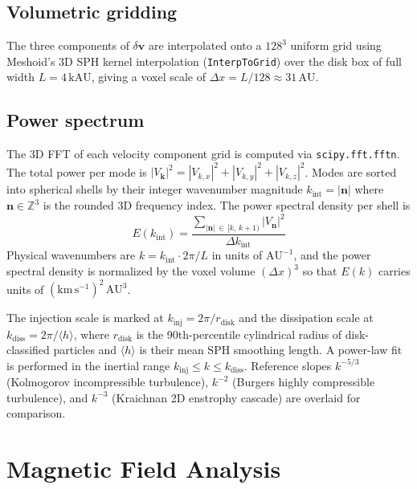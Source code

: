 \documentclass[12pt]{article}
\begin{document}
\subsection*{Volumetric gridding}

The three components of $\delta\mathbf{v}$ are interpolated onto a $128^3$
uniform grid using Meshoid's 3D SPH kernel interpolation (\texttt{InterpToGrid})
over the disk box of full width $L = 4\,\mathrm{kAU}$, giving a voxel scale of
$\Delta x = L/128 \approx 31\,\mathrm{AU}$.

\subsection*{Power spectrum}

The 3D FFT of each velocity component grid is computed via
\texttt{scipy.fft.fftn}. The total power per mode is
$|V_\mathbf{k}|^2 = |V_{k,x}|^2 + |V_{k,y}|^2 + |V_{k,z}|^2$. Modes are
sorted into spherical shells by their integer wavenumber magnitude
$k_\mathrm{int} = |\mathbf{n}|$ where
$\mathbf{n} \in \mathbb{Z}^3$ is the rounded 3D frequency index. The power
spectral density per shell is
\begin{equation}
    E(k_\mathrm{int}) = \frac{\sum_{|\mathbf{n}|\,\in\,[k,\,k+1)} |V_\mathbf{n}|^2}{\Delta k_\mathrm{int}}
\end{equation}
Physical wavenumbers are $k = k_\mathrm{int}\cdot 2\pi/L$ in units of
$\mathrm{AU}^{-1}$, and the power spectral density is normalized by the voxel
volume $(\Delta x)^3$ so that $E(k)$ carries units of
$(\mathrm{km\,s^{-1}})^2\,\mathrm{AU}^3$.

The injection scale is marked at $k_\mathrm{inj} = 2\pi/r_\mathrm{disk}$ and the
dissipation scale at $k_\mathrm{diss} = 2\pi/\langle h\rangle$, where
$r_\mathrm{disk}$ is the 90th-percentile cylindrical radius of disk-classified
particles and $\langle h\rangle$ is their mean SPH smoothing length. A power-law
fit is performed in the inertial range $k_\mathrm{inj} \leq k \leq k_\mathrm{diss}$.
Reference slopes $k^{-5/3}$ (Kolmogorov incompressible turbulence),
$k^{-2}$ (Burgers highly compressible turbulence), and $k^{-3}$ (Kraichnan
2D enstrophy cascade) are overlaid for comparison.


\section{Magnetic Field Analysis}
\end{document}
